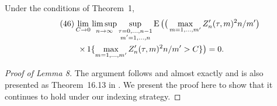 \documentclass[11pt]{article}
\begin{document}
{%
\newcommand{\uiterm}{\max_{m \in 1,\dots,m'} \Big(
  \sum_{t \in I_n(\tau, m)} (X_{nt} - \mu_{nt})\Big)^2 \Big/
  \sum_{t\in I_n(\tau, m')} c_{nt}^2}
\newcommand{\uitermb}{\sum_{\tau=0}^{n-1} \tfrac{1}{n m'} \max_{m \in 1,\dots,m'} \Big(
  \sum_{t \in I_n(\tau, m)} (X_{nt} - \bar X_n)\Big)^2}
\begin{customlem}{8}
  Under the conditions of Theorem~1,
  \begin{multline}\label{eq:5}\tag{46}
    \lim_{C \to 0} \limsup_{n \to \infty} \sup_{\substack{\tau = 0,\dots,n-1 \\  m' = 1,\dots,n}}
    \operatorname{E}\big(\big(\max_{m=1,\dots,m'} Z'_n(\tau, m)^2 n / m'\big) \\
    \times\operatorname{1}\{\max_{m=1,\dots,m'} Z'_n(\tau, m)^2 n / m' > C\}\big) = 0.
  \end{multline}
\end{customlem}

\begin{proof}[Proof of Lemma 8]
  \newcommand{\w}{w_{n}(\tau, m')}
  \newcommand{\sums}[1]{\Big(\sum_{t \in I_{n}(\tau, m)} #1_{nt} \Big)^2}
  \renewcommand{\uiterm}{\max_{m \in 1,\dots,m'} \Big(
    \sum_{t \in I_n(\tau, m)} X_{nt}\Big)^2 \Big/
    \Big(\sum_{t\in I_n(\tau, m')} c_{nt} \Big)^2}

  The argument follows \citet[Lemma 6.5]{Mcl:75b} and
  \citet[Lemma 3.5]{Mcl:77} almost exactly and is also presented as
  Theorem~16.13 in \citet{Dav:94}. We present the proof here to show
  that it continues to hold under our indexing strategy.


\end{proof}}
\end{document}
